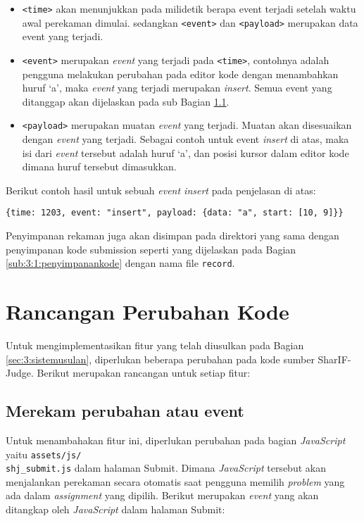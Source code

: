 \begin{itemize}
    \item \verb|<time>| akan menunjukkan pada milidetik berapa event terjadi setelah waktu awal perekaman dimulai. sedangkan \verb|<event>| dan \verb|<payload>| merupakan data event yang terjadi.

    \item \verb|<event>| merupakan \textit{event} yang terjadi pada \verb|<time>|, contohnya adalah pengguna melakukan perubahan pada editor kode dengan menambahkan huruf `a', maka \textit{event} yang terjadi merupakan \textit{insert}. Semua event yang ditanggap akan dijelaskan pada sub Bagian \ref{sub:4:3:merekam}.

    \item \verb|<payload>| merupakan muatan \textit{event} yang terjadi. Muatan akan disesuaikan dengan \textit{event} yang terjadi. Sebagai contoh untuk event \textit{insert} di atas, maka isi dari \textit{event} tersebut adalah huruf `a', dan posisi kursor dalam editor kode dimana huruf tersebut dimasukkan.
\end{itemize}

Berikut contoh hasil untuk sebuah \textit{event insert} pada penjelasan di atas:

\begin{center}
    \verb|{time: 1203, event: "insert", payload: {data: "a", start: [10, 9]}}|
\end{center}

Penyimpanan rekaman juga akan disimpan pada direktori yang sama dengan penyimpanan kode submission seperti yang dijelaskan pada Bagian \ref{sub:3:1:penyimpanankode} dengan nama file \verb|record|.

\section{Rancangan Perubahan Kode}

Untuk mengimplementasikan fitur yang telah diusulkan pada Bagian \ref{sec:3:sistemusulan}, diperlukan beberapa perubahan pada kode sumber SharIF-Judge. Berikut merupakan rancangan untuk setiap fitur:

\subsection{Merekam perubahan atau event}
\label{sub:4:3:merekam}

Untuk menambahakan fitur ini, diperlukan perubahan pada bagian \textit{JavaScript} yaitu \verb|assets/js/|\\\verb|shj_submit.js| dalam halaman Submit. Dimana \textit{JavaScript} tersebut akan menjalankan perekaman secara otomatis saat pengguna memilih \textit{problem} yang ada dalam \textit{assignment} yang dipilih. Berikut merupakan \textit{event} yang akan ditangkap oleh \textit{JavaScript} dalam halaman Submit:

